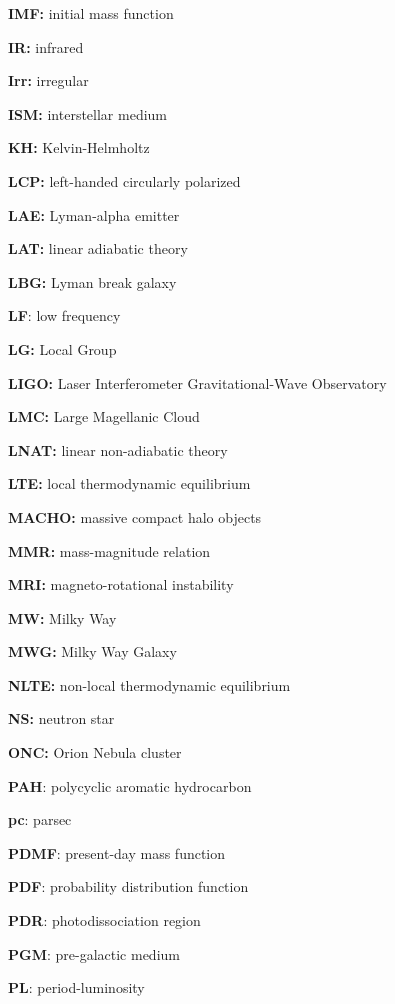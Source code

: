 \documentclass[a4paper,10pt]{article}
\begin{document}
{\noindent}\textbf{IMF:} initial mass function

{\noindent}\textbf{IR:} infrared

{\noindent}\textbf{Irr:} irregular

{\noindent}\textbf{ISM:} interstellar medium

{\noindent}\textbf{KH:} Kelvin-Helmholtz

{\noindent}\textbf{LCP:} left-handed circularly polarized

{\noindent}\textbf{LAE:} Lyman-alpha emitter

{\noindent}\textbf{LAT:} linear adiabatic theory

{\noindent}\textbf{LBG:} Lyman break galaxy

{\noindent}\textbf{LF}: low frequency

{\noindent}\textbf{LG:} Local Group

{\noindent}\textbf{LIGO:} Laser Interferometer Gravitational-Wave Observatory

{\noindent}\textbf{LMC:} Large Magellanic Cloud

{\noindent}\textbf{LNAT:} linear non-adiabatic theory

{\noindent}\textbf{LTE:} local thermodynamic equilibrium

{\noindent}\textbf{MACHO:} massive compact halo objects

{\noindent}\textbf{MMR:} mass-magnitude relation

{\noindent}\textbf{MRI:} magneto-rotational instability

{\noindent}\textbf{MW:} Milky Way

{\noindent}\textbf{MWG:} Milky Way Galaxy

{\noindent}\textbf{NLTE:} non-local thermodynamic equilibrium

{\noindent}\textbf{NS:} neutron star

{\noindent}\textbf{ONC:} Orion Nebula cluster

{\noindent}\textbf{PAH}: polycyclic aromatic hydrocarbon

{\noindent}\textbf{pc}: parsec

{\noindent}\textbf{PDMF}: present-day mass function

{\noindent}\textbf{PDF}: probability distribution function

{\noindent}\textbf{PDR}: photodissociation region

{\noindent}\textbf{PGM}: pre-galactic medium

{\noindent}\textbf{PL}: period-luminosity
\end{document}
